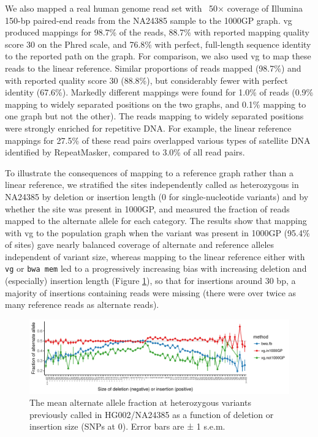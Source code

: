 We also mapped a real human genome read set with ~50× coverage of Illumina 150-bp paired-end reads from the NA24385 sample to the 1000GP graph. vg produced mappings for 98.7\% of the reads, 88.7\%
with reported mapping quality score 30 on the Phred scale, and 76.8\% with perfect, full-length sequence identity to the reported path on the graph.
For comparison, we also used vg to map these reads to the linear reference.
Similar proportions of reads mapped (98.7\%) and with reported quality score 30 (88.8\%), but considerably fewer with perfect identity (67.6\%).
Markedly different mappings were found for 1.0\% of reads (0.9\% mapping to widely separated positions on the two graphs, and 0.1\% mapping to one graph but not the other).
The reads mapping to widely separated positions were strongly enriched for repetitive DNA. For example, the linear reference mappings for 27.5\% of these read pairs overlapped various types of satellite DNA identified by RepeatMasker, compared to 3.0\% of all read pairs.

To illustrate the consequences of mapping to a reference graph rather than a linear reference, we stratified the sites independently called as heterozygous in NA24385 by deletion or insertion length (0 for single-nucleotide variants) and by whether the site was present in 1000GP, and measured the fraction of reads mapped to the alternate allele for each category.
The results show that mapping with vg to the population graph when the variant was present in 1000GP (95.4\% of sites) gave nearly balanced coverage of alternate and reference alleles independent of variant size, whereas mapping to the linear reference either with {\tt vg} or {\tt bwa mem} led to a progressively increasing bias with increasing deletion and (especially) insertion length (Figure \ref{fig:HG002_indels}), so that for insertions around 30 bp, a majority of insertions containing reads were missing (there were over twice as many reference reads as alternate reads).

\begin{figure}[htbp!] 
\centering    
\includegraphics[width=1.0\textwidth]{Chapter3/Figs/HG002_wg_pan_ref_bwa_true_hets_allele_balance_tsv_gz_3.pdf}
\caption[Indel allele balance in HG002]{The mean alternate allele fraction at heterozygous variants previously called in HG002/NA24385 as a function of deletion or insertion size (SNPs at 0). Error bars are ± 1 s.e.m.}
\label{fig:HG002_indels}
\end{figure}

